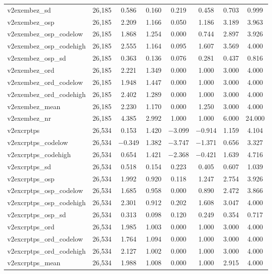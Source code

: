 \begin{table}[!htbp]
\begin{tabular}{@{\extracolsep{5pt}}lccccccc}
v2exembez\_sd & 26,185 & 0.586 & 0.160 & 0.219 & 0.458 & 0.703 & 0.999 \\ 
v2exembez\_osp & 26,185 & 2.209 & 1.166 & 0.050 & 1.186 & 3.189 & 3.963 \\ 
v2exembez\_osp\_codelow & 26,185 & 1.868 & 1.254 & 0.000 & 0.744 & 2.897 & 3.926 \\ 
v2exembez\_osp\_codehigh & 26,185 & 2.555 & 1.164 & 0.095 & 1.607 & 3.569 & 4.000 \\ 
v2exembez\_osp\_sd & 26,185 & 0.363 & 0.136 & 0.076 & 0.281 & 0.437 & 0.816 \\ 
v2exembez\_ord & 26,185 & 2.221 & 1.349 & 0.000 & 1.000 & 3.000 & 4.000 \\ 
v2exembez\_ord\_codelow & 26,185 & 1.948 & 1.447 & 0.000 & 1.000 & 3.000 & 4.000 \\ 
v2exembez\_ord\_codehigh & 26,185 & 2.402 & 1.289 & 0.000 & 1.000 & 3.000 & 4.000 \\ 
v2exembez\_mean & 26,185 & 2.230 & 1.170 & 0.000 & 1.250 & 3.000 & 4.000 \\ 
v2exembez\_nr & 26,185 & 4.385 & 2.992 & 1.000 & 1.000 & 6.000 & 24.000 \\ 
v2excrptps & 26,534 & 0.153 & 1.420 & $-$3.099 & $-$0.914 & 1.159 & 4.104 \\ 
v2excrptps\_codelow & 26,534 & $-$0.349 & 1.382 & $-$3.747 & $-$1.371 & 0.656 & 3.327 \\ 
v2excrptps\_codehigh & 26,534 & 0.654 & 1.421 & $-$2.368 & $-$0.421 & 1.639 & 4.716 \\ 
v2excrptps\_sd & 26,534 & 0.518 & 0.154 & 0.223 & 0.405 & 0.607 & 1.039 \\ 
v2excrptps\_osp & 26,534 & 1.992 & 0.920 & 0.118 & 1.247 & 2.754 & 3.926 \\ 
v2excrptps\_osp\_codelow & 26,534 & 1.685 & 0.958 & 0.000 & 0.890 & 2.472 & 3.866 \\ 
v2excrptps\_osp\_codehigh & 26,534 & 2.301 & 0.912 & 0.202 & 1.608 & 3.047 & 4.000 \\ 
v2excrptps\_osp\_sd & 26,534 & 0.313 & 0.098 & 0.120 & 0.249 & 0.354 & 0.717 \\ 
v2excrptps\_ord & 26,534 & 1.985 & 1.003 & 0.000 & 1.000 & 3.000 & 4.000 \\ 
v2excrptps\_ord\_codelow & 26,534 & 1.764 & 1.094 & 0.000 & 1.000 & 3.000 & 4.000 \\ 
v2excrptps\_ord\_codehigh & 26,534 & 2.127 & 1.002 & 0.000 & 1.000 & 3.000 & 4.000 \\ 
v2excrptps\_mean & 26,534 & 1.988 & 1.008 & 0.000 & 1.000 & 2.915 & 4.000 \\ 

\end{tabular}
\end{table}
